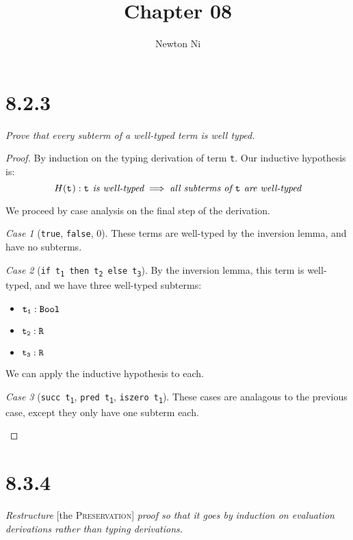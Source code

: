 \documentclass{article}
\title{Chapter 08}
\author{Newton Ni}
\newcommand{\term}[1]{\texttt{t\textsubscript{#1}}}
\newcommand{\ms}[1]{\texttt{#1}}
\theoremstyle{remark}
\newtheorem*{case}{Case}
\begin{document}
\maketitle

\section{8.2.3}

    \textit{Prove that every subterm of a well-typed term is well typed.}

    \begin{proof}
        By induction on the typing derivation of term \term{}. Our inductive hypothesis is:
        $$H(\term{}): \term{} \textit{ is well-typed} \implies \textit{all subterms of } \term{} \textit{ are well-typed}$$

        We proceed by case analysis on the final step of the derivation.
        \begin{case}[\ms{true}, \ms{false}, 0]
            These terms are well-typed by the inversion lemma, and have no subterms.
        \end{case}
        \begin{case}[\ms{if \term{1} then \term{2} else \term{3}}]
            By the inversion lemma, this term is well-typed, and we have three well-typed subterms:
            \begin{itemize}
                \item $\term{1} : \ms{Bool}$
                \item $\term{2} : \ms{R}$
                \item $\term{3} : \ms{R}$
            \end{itemize}
            We can apply the inductive hypothesis to each.
        \end{case}
        \begin{case}[\ms{succ \term{1}}, \ms{pred \term{1}}, \ms{iszero \term{1}}]
            These cases are analagous to the previous case, except they
            only have one subterm each.
        \end{case}
    \end{proof}

\section{8.3.4}

    \textit{Restructure} [the \textsc{Preservation}] \textit{proof so that it goes by}
    \textit{induction on evaluation derivations rather than typing derivations.}
\end{document}
